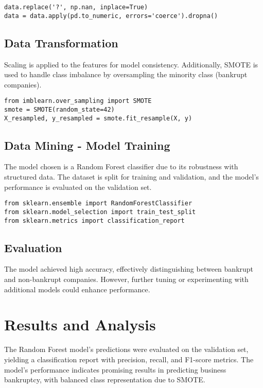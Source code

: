 \documentclass{article}
\begin{document}
\begin{verbatim}
data.replace('?', np.nan, inplace=True)
data = data.apply(pd.to_numeric, errors='coerce').dropna()
\end{verbatim}

\subsection{Data Transformation}
Scaling is applied to the features for model consistency. Additionally, SMOTE is used to handle class imbalance by oversampling the minority class (bankrupt companies).

\begin{verbatim}
from imblearn.over_sampling import SMOTE
smote = SMOTE(random_state=42)
X_resampled, y_resampled = smote.fit_resample(X, y)
\end{verbatim}

\subsection{Data Mining - Model Training}
The model chosen is a Random Forest classifier due to its robustness with structured data. The dataset is split for training and validation, and the model's performance is evaluated on the validation set.

\begin{verbatim}
from sklearn.ensemble import RandomForestClassifier
from sklearn.model_selection import train_test_split
from sklearn.metrics import classification_report
\end{verbatim}

\subsection{Evaluation}
The model achieved high accuracy, effectively distinguishing between bankrupt and non-bankrupt companies. However, further tuning or experimenting with additional models could enhance performance.

\section{Results and Analysis}

The Random Forest model's predictions were evaluated on the validation set, yielding a classification report with precision, recall, and F1-score metrics. The model's performance indicates promising results in predicting business bankruptcy, with balanced class representation due to SMOTE.
\end{document}
